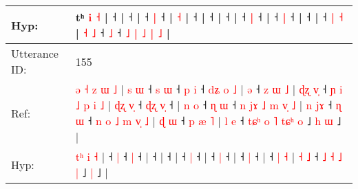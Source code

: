 \documentclass[10pt]{article}
\DeclareRobustCommand{\hl}[1]{{\textcolor{red}{#1}}}
\begin{document}
\begin{longtable}{ll}
 \\
Hyp: & \hl{}\hl{}\hl{}\hl{}\hl{}\hl{}\hl{}t\hl{}\hl{}\hl{}\hl{}\hl{}\hl{}\hl{}\hl{}\hl{}\hl{}\hl{}\hl{}\hl{}\hl{}ʰ\hl{}\hl{}\hl{}\hl{}\hl{}\hl{} \hl{i} \hl{˧} |\hl{}\hl{}\hl{} ˧\hl{}\hl{}\hl{}\hl{}\hl{}\hl{} |\hl{}\hl{}\hl{}\hl{} ˧\hl{}\hl{}\hl{}\hl{}\hl{}\hl{} |\hl{}\hl{}\hl{}\hl{}\hl{} ˧\hl{}\hl{}\hl{}\hl{} \hl{|} ˧ |\hl{}\hl{}\hl{}\hl{}\hl{} \hl{}\hl{˧} |\hl{}\hl{}\hl{}\hl{}\hl{}\hl{}\hl{}\hl{}\hl{}\hl{}\hl{} ˧ |\hl{}\hl{}\hl{} ˧\hl{}\hl{}\hl{}\hl{}\hl{}\hl{} |\hl{}\hl{}\hl{}\hl{}\hl{}\hl{}\hl{}\hl{} ˧\hl{} |\hl{}\hl{}\hl{}\hl{}\hl{} ˧\hl{}\hl{}\hl{}\hl{} \hl{|} ˧ |\hl{}\hl{}\hl{}\hl{} ˧\hl{}\hl{}\hl{}\hl{} \hl{|} ˧ |\hl{}\hl{}\hl{}\hl{}\hl{} ˧\hl{}\hl{}\hl{}\hl{}\hl{}\hl{}\hl{}\hl{} |\hl{}\hl{}\hl{}\hl{}\hl{} ˧\hl{}\hl{}\hl{}\hl{} \hl{|} \hl{˧} | \hl{}\hl{}\hl{˧} \hl{˩} ˧\hl{}\hl{} \hl{˩} ˧\hl{}\hl{}\hl{}\hl{} \hl{˩} \hl{|} \hl{}\hl{}\hl{˩} \hl{|} \hl{˩} |
 \\
\midrule
Utterance ID: & 155 \\
Ref: & \hl{ə}\hl{ }\hl{˧}\hl{ }\hl{z} \hl{ɯ} \hl{˩} |\hl{ }\hl{s}\hl{ }\hl{ɯ} ˧\hl{ }\hl{s} \hl{ɯ} ˧\hl{ }\hl{p} \hl{i} ˧\hl{ }\hl{d}\hl{ʑ}\hl{ }\hl{o}\hl{ }\hl{˩} |\hl{ }\hl{ə} ˧\hl{ }\hl{z}\hl{ }\hl{ɯ}\hl{ }\hl{˩} |\hl{ }\hl{ɖ}\hl{ʐ}\hl{ }\hl{v}\hl{̩} ˧\hl{ }\hl{ɲ}\hl{ }\hl{i}\hl{ }\hl{˩}\hl{ }\hl{p}\hl{ }\hl{i}\hl{ }\hl{˩} |\hl{ }\hl{ɖ}\hl{ʐ}\hl{ }\hl{v}\hl{̩} ˧\hl{ }\hl{ɖ}\hl{ʐ} \hl{v}\hl{̩} ˧ |\hl{ }\hl{n}\hl{ }\hl{o} ˧\hl{ }\hl{ɳ} \hl{ɯ} ˧\hl{ }\hl{n}\hl{ }\hl{j}\hl{ɤ}\hl{ }\hl{˩}\hl{ }\hl{m}\hl{ }\hl{v}\hl{̩}\hl{ }\hl{˩} |\hl{ }\hl{n}\hl{ }\hl{j}\hl{ɤ} ˧\hl{ }\hl{ɳ} \hl{ɯ} ˧\hl{ }\hl{n}\hl{ }\hl{o}\hl{ }\hl{˩}\hl{ }\hl{m}\hl{ }\hl{v}\hl{̩}\hl{ }\hl{˩} |\hl{ }\hl{ɖ}\hl{ }\hl{ɯ} ˧\hl{ }\hl{p} \hl{æ} \hl{˥} | \hl{l} \hl{e} ˧\hl{ }\hl{t}\hl{ɕ}\hl{ʰ} \hl{o} \hl{˥} \hl{t}\hl{ɕ}\hl{ʰ} \hl{o} ˩\hl{ }\hl{h} \hl{ɯ} ˩ |
 \\
Hyp: & \hl{}\hl{}\hl{}\hl{t}\hl{ʰ} \hl{i} \hl{˧} |\hl{}\hl{}\hl{}\hl{} ˧\hl{}\hl{} \hl{|} ˧\hl{}\hl{} \hl{|} ˧\hl{}\hl{}\hl{}\hl{}\hl{}\hl{}\hl{} |\hl{}\hl{} ˧\hl{}\hl{}\hl{}\hl{}\hl{}\hl{} |\hl{}\hl{}\hl{}\hl{}\hl{}\hl{} ˧\hl{}\hl{}\hl{}\hl{}\hl{}\hl{}\hl{}\hl{}\hl{}\hl{}\hl{}\hl{} |\hl{}\hl{}\hl{}\hl{}\hl{}\hl{} ˧\hl{}\hl{}\hl{} \hl{}\hl{|} ˧ |\hl{}\hl{}\hl{}\hl{} ˧\hl{}\hl{} \hl{|} ˧\hl{}\hl{}\hl{}\hl{}\hl{}\hl{}\hl{}\hl{}\hl{}\hl{}\hl{}\hl{}\hl{}\hl{} |\hl{}\hl{}\hl{}\hl{}\hl{} ˧\hl{}\hl{} \hl{|} ˧\hl{}\hl{}\hl{}\hl{}\hl{}\hl{}\hl{}\hl{}\hl{}\hl{}\hl{}\hl{}\hl{} |\hl{}\hl{}\hl{}\hl{} ˧\hl{}\hl{} \hl{|} \hl{˧} | \hl{˧} \hl{˩} ˧\hl{}\hl{}\hl{}\hl{} \hl{˩} \hl{˧} \hl{}\hl{}\hl{˩} \hl{|} ˩\hl{}\hl{} \hl{|} ˩ |

\end{longtable}
\end{document}
